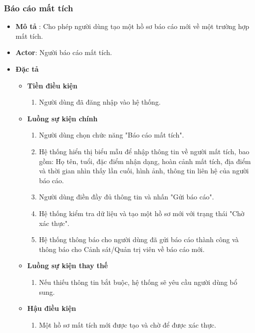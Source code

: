 \documentclass[../DoAn.tex]{subfiles}
\begin{document}
\subsubsection{Báo cáo mất tích}
\begin{itemize}
	\item \textbf{Mô tả} : Cho phép người dùng tạo một hồ sơ báo cáo mới về một trường hợp mất tích.
	\item \textbf{Actor}: Người báo cáo mất tích.
	\item \textbf{Đặc tả}
	      \begin{itemize}
		      \item \textbf{Tiền điều kiện}
		            \begin{enumerate}
			            \item Người dùng đã đăng nhập vào hệ thống.
		            \end{enumerate}
		      \item \textbf{Luồng sự kiện chính}
		            \begin{enumerate}
			            \item Người dùng chọn chức năng "Báo cáo mất tích".
			            \item Hệ thống hiển thị biểu mẫu để nhập thông tin về người mất tích, bao gồm: Họ tên, tuổi, đặc điểm nhận dạng, hoàn cảnh mất tích, địa điểm và thời gian nhìn thấy lần cuối, hình ảnh, thông tin liên hệ của người báo cáo.
			            \item Người dùng điền đầy đủ thông tin và nhấn "Gửi báo cáo".
			            \item Hệ thống kiểm tra dữ liệu và tạo một hồ sơ mới với trạng thái "Chờ xác thực".
			            \item Hệ thống thông báo cho người dùng đã gửi báo cáo thành công và thông báo cho Cảnh sát/Quản trị viên về báo cáo mới.
		            \end{enumerate}
		      \item \textbf{Luồng sự kiện thay thế}
		            \begin{enumerate}
			            \item Nếu thiếu thông tin bắt buộc, hệ thống sẽ yêu cầu người dùng bổ sung.
		            \end{enumerate}
		      \item \textbf{Hậu điều kiện}
		            \begin{enumerate}
			            \item Một hồ sơ mất tích mới được tạo và chờ để được xác thực.
		            \end{enumerate}
	      \end{itemize}
\end{itemize}
\end{document}
